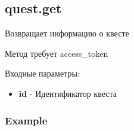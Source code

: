 \subsection{quest.get}
Возвращает информацию о квесте

Метод требует access\_token

Входные параметры:
\begin{itemize}
  \item \textbf{id} - Идентификатор квеста
\end{itemize}

\subsubsection{Example}
\begin{Verbatim}[frame=single]

\end{Verbatim}